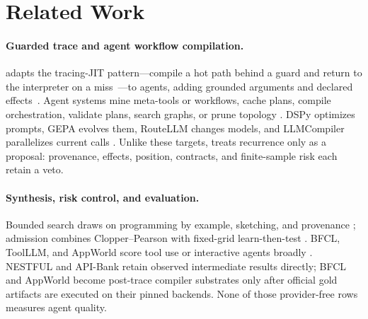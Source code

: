 \section{Related Work}
\label{sec:related}

\paragraph{Guarded trace and agent workflow compilation.}
\method adapts the tracing-JIT pattern---compile a hot path behind a guard and
return to the interpreter on a miss~\citep{bala2000dynamo,holzle1992deopt}---to
agents, adding grounded arguments and declared effects~\citep{lucassen1988effects}.
Agent systems mine meta-tools or workflows, cache plans, compile orchestration,
validate plans, search graphs, or prune topology
\citep{abuzakuk2026awo,wang2025awm,zhang2025plancache,wei2026evoc2f,winston2026agentjit,li2026flowcompile,chen2026agentslimming}.
DSPy optimizes prompts, GEPA evolves them, RouteLLM changes models, and
LLMCompiler parallelizes current calls
\citep{khattab2024dspy,agrawal2026gepa,ong2025routellm,kim2024llmcompiler}.
Unlike these targets, \method treats recurrence only as a proposal: provenance,
effects, position, contracts, and finite-sample risk each retain a veto.

\paragraph{Synthesis, risk control, and evaluation.}
Bounded search draws on programming by example, sketching, and provenance
\citep{gulwani2011flashfill,solarlezama2006sketching,cheney2009provenance};
admission combines Clopper--Pearson with fixed-grid learn-then-test
\citep{clopper1934binomial,angelopoulos2022ltt}. BFCL, ToolLLM, and AppWorld
score tool use or interactive agents broadly
\citep{patil2025bfcl,qin2023toolllm,trivedi2024appworld}. NESTFUL and API-Bank
retain observed intermediate results directly; BFCL and AppWorld become
post-trace compiler substrates only after official gold artifacts are executed
on their pinned backends. None of those provider-free rows measures agent quality.
